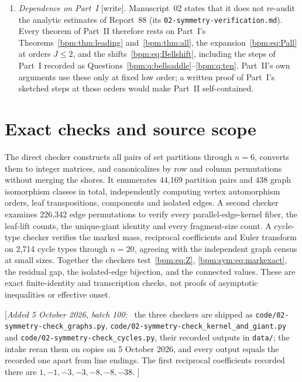 \documentclass[11pt,a4paper]{article}
\theoremstyle{remark}\newtheorem{remark}[theorem]{Remark}%
\newenvironment{writenote}{\par\smallskip\noindent\small[\textit{Added 5 October 2026, batch 100:}\ }{]\par\smallskip}
\begin{document}
\begin{enumerate}
\item\label{bpm:sym:q:inputs} \emph{Dependence on Part~I} [write].
Manuscript~02 states that it does not re-audit the analytic estimates of
Report~88 (its \nolinkurl{02-symmetry-verification.md}). Every theorem of
Part~II therefore rests on Part~I's Theorems~\ref{bpm:thm:leading}
and~\ref{bpm:thm:all}, the expansion~\eqref{bpm:eq:Pall} at orders $J\le2$,
and the shifts~\eqref{bpm:eq:Bellshift}, including the steps of Part~I
recorded as Questions~\ref{bpm:q:bellsaddle}--\ref{bpm:q:ten}. Part~II's own
arguments use these only at fixed low order; a written proof of Part~I's
sketched steps at those orders would make Part~II self-contained.
\end{enumerate}

\section{Exact checks and source scope}\label{bpm:sym:sec:scope}
The direct checker constructs all pairs of set partitions through $n=6$, converts them to integer matrices, and canonicalizes by row and column permutations without merging the shores. It enumerates 44,169 partition pairs and 438 graph isomorphism classes in total, independently computing vertex automorphism orders, leaf transpositions, components and isolated edges. A second checker examines 226,342 edge permutations to verify every parallel-edge-kernel fiber, the leaf-lift counts, the unique-giant identity and every fragment-size count. A cycle-type checker verifies the marked mass, reciprocal coefficients and Euler transform on 2,714 cycle types through $n=20$, agreeing with the independent graph census at small sizes. Together the checkers test~\eqref{bpm:eq:Z}, \eqref{bpm:sym:eq:markexact}, the residual gap, the isolated-edge bijection, and the connected values. These are exact finite-identity and transcription checks, not proofs of asymptotic inequalities or effective onset.

\begin{writenote}
the three checkers are shipped as
\nolinkurl{code/02-symmetry-check_graphs.py},
\nolinkurl{code/02-symmetry-check_kernel_and_giant.py} and
\nolinkurl{code/02-symmetry-check_cycles.py}, their recorded outputs in
\nolinkurl{data/}; the intake reran them on copies on 5 October 2026, and every
output equals the recorded one apart from line endings. The first
reciprocal coefficients recorded there are $1,-1,-3,-3,-8,-8,-38$.
\end{writenote}
\end{document}
